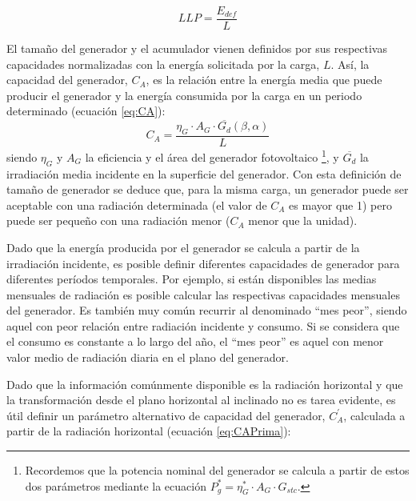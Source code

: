 \begin{equation}
LLP=\frac{E_{def}}{L}\label{eq:LLP}\end{equation}


El tamaño del generador y el acumulador vienen definidos por sus respectivas
capacidades normalizadas con la energía solicitada por la carga, $L$.
Así, la capacidad del generador, $C_{A}$,
es la relación entre la energía media que puede producir el generador
y la energía consumida por la carga en un periodo determinado (ecuación
\ref{eq:CA}): \begin{equation}
C_{A}=\frac{\eta_{G}\cdot A_{G}\cdot\overline{G_{d}}(\beta,\alpha)}{L}\label{eq:CA}\end{equation}
siendo $\eta_{G}$ y $A_{G}$
la eficiencia y el área del generador fotovoltaico%
\footnote{Recordemos que la potencia nominal del generador se calcula a partir
de estos dos parámetros mediante la ecuación $P_{g}^{*}=\eta_{G}^{*}\cdot A_{G}\cdot G_{stc}$. %
}, y $\overline{G_{d}}$ la irradiación media incidente en la superficie
del generador. Con esta definición de tamaño de generador se deduce
que, para la misma carga, un generador puede ser aceptable con una
radiación determinada (el valor de $C_{A}$ es mayor que 1) pero puede
ser pequeño con una radiación menor ($C_{A}$ menor que la unidad).

Dado que la energía producida por el generador se calcula a partir
de la irradiación incidente, es posible definir diferentes capacidades
de generador para diferentes períodos temporales. Por ejemplo, si
están disponibles las medias mensuales de radiación es posible calcular
las respectivas capacidades mensuales del generador. Es también muy
común recurrir al denominado {}``mes peor'', siendo aquel con peor
relación entre radiación incidente y consumo. Si se considera que el consumo
es constante a lo largo del año, el {}``mes peor'' es aquel con
menor valor medio de radiación diaria en el plano del generador. 

Dado que la información comúnmente disponible es la radiación horizontal
y que la transformación desde el plano horizontal al inclinado no
es tarea evidente, es útil definir un parámetro alternativo de capacidad
del generador, $C_{A}^{'}$, calculada a partir de la radiación horizontal
(ecuación \ref{eq:CAPrima}):

